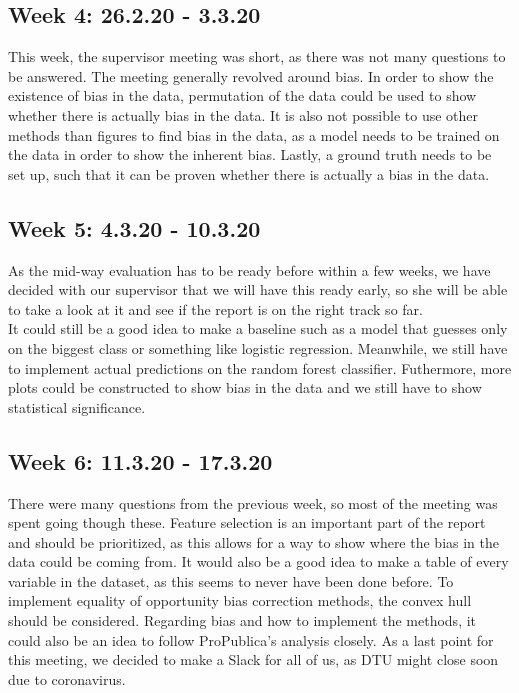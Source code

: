 \documentclass[11pt, fleqn]{article}
\begin{document}
\subsection*{Week 4: 26.2.20 - 3.3.20}
This week, the supervisor meeting was short, as there was not many questions to be answered. The meeting generally revolved around bias. In order to show the existence of bias in the data, permutation of the data could be used to show whether there is actually bias in the data. It is also not possible to use other methods than figures to find bias in the data, as a model needs to be trained on the data in order to show the inherent bias. Lastly, a ground truth needs to be set up, such that it can be proven whether there is actually a bias in the data.

\subsection*{Week 5: 4.3.20 - 10.3.20}
As the mid-way evaluation has to be ready before within a few weeks, we have decided with our supervisor that we will have this ready early, so she will be able to take a look at it and see if the report is on the right track so far. \\
It could still be a good idea to make a baseline such as a model that guesses only on the biggest class or something like logistic regression. Meanwhile, we still have to implement actual predictions on the random forest classifier. Futhermore, more plots could be constructed to show bias in the data and we still have to show statistical significance.

\subsection*{Week 6: 11.3.20 - 17.3.20}
There were many questions from the previous week, so most of the meeting was spent going though these. Feature selection is an important part of the report and should be prioritized, as this allows for a way to show where the bias in the data could be coming from. It would also be a good idea to make a table of every variable in the dataset, as this seems to never have been done before. To implement equality of opportunity bias correction methods, the convex hull should be considered. Regarding bias and how to implement the methods, it could also be an idea to follow ProPublica's analysis closely. As a last point for this meeting, we decided to make a Slack for all of us, as DTU might close soon due to coronavirus.
\end{document}
